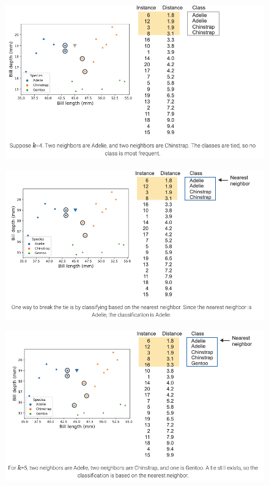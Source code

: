\documentclass[8pt,dvipsnames]{beamer}
\begin{document}
\begin{frame}
	\begin{figure}[ht]
		\centering
		\includegraphics[width=\linewidth]{imgs/knn_23.png}
	\end{figure}
\end{frame}

\begin{frame}
	\begin{figure}[ht]
		\centering
		\includegraphics[width=\linewidth]{imgs/knn_24.png}
	\end{figure}
\end{frame}

\begin{frame}
	\begin{figure}[ht]
		\centering
		\includegraphics[width=\linewidth]{imgs/knn_25.png}
	\end{figure}
\end{frame}
\end{document}
